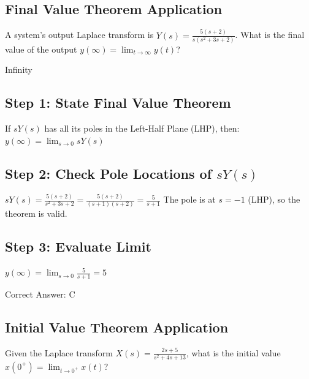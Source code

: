 \clearpage

\subsection{Final Value Theorem Application}

A system's output Laplace transform is $Y(s) = \frac{5(s+2)}{s(s^2 + 3s + 2)}$. What is the final value of the output $y(\infty) = \lim_{t \to \infty} y(t)$?

\begin{choices}
    \choice Infinity
\end{choices}

\begin{solution}

\subsection*{Step 1: State Final Value Theorem}
If $s Y(s)$ has all its poles in the Left-Half Plane (LHP), then:
$y(\infty) = \lim_{s \to 0} s Y(s)$

\subsection*{Step 2: Check Pole Locations of $s Y(s)$}
$s Y(s) = \frac{5(s+2)}{s^2 + 3s + 2} = \frac{5(s+2)}{(s+1)(s+2)} = \frac{5}{s+1}$
The pole is at $s = -1$ (LHP), so the theorem is valid.

\subsection*{Step 3: Evaluate Limit}
$y(\infty) = \lim_{s \to 0} \frac{5}{s+1} = 5$

Correct Answer: C
\end{solution}

\clearpage

\subsection{Initial Value Theorem Application}

Given the Laplace transform $X(s) = \frac{2s + 5}{s^2 + 4s + 13}$, what is the initial value $x(0^+) = \lim_{t \to 0^+} x(t)$?

\begin{choices}
\end{choices}


